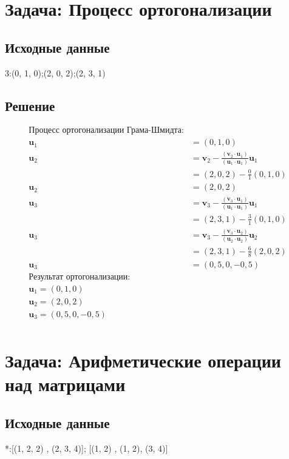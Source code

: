 \documentclass{article}
\begin{document}
\section{Задача: Процесс ортогонализации}
\subsection{Исходные данные}
3:(0, 1, 0);(2, 0, 2);(2, 3, 1)
\subsection{Решение}
\begin{align*}
\text{Процесс ортогонализации Грама-Шмидта:}\\
\mathbf{u}_1 &= (0, 1, 0) \\
\mathbf{u}_2 &= \mathbf{v}_2 - \frac{(\mathbf{v}_2 \cdot \mathbf{u}_1)}{(\mathbf{u}_1 \cdot \mathbf{u}_1)} \mathbf{u}_1 \\
&= (2, 0, 2) - \frac{0}{1}(0, 1, 0) \\
\mathbf{u}_2 &= (2, 0, 2) \\
\mathbf{u}_3 &= \mathbf{v}_3 - \frac{(\mathbf{v}_3 \cdot \mathbf{u}_1)}{(\mathbf{u}_1 \cdot \mathbf{u}_1)} \mathbf{u}_1 \\
&= (2, 3, 1) - \frac{3}{1}(0, 1, 0) \\
\mathbf{u}_3 &= \mathbf{v}_3 - \frac{(\mathbf{v}_3 \cdot \mathbf{u}_2)}{(\mathbf{u}_2 \cdot \mathbf{u}_2)} \mathbf{u}_2 \\
&= (2, 3, 1) - \frac{6}{8}(2, 0, 2) \\
\mathbf{u}_3 &= (0,5, 0, -0,5) \\
\text{Результат ортогонализации:}\\
\mathbf{u}_1 = (0, 1, 0) \\
\mathbf{u}_2 = (2, 0, 2) \\
\mathbf{u}_3 = (0,5, 0, -0,5) \\
\end{align*}
\section{Задача: Арифметические операции над матрицами}
\subsection{Исходные данные}
*:[(1, 2, 2) ,  (2, 3, 4)]; [(1, 2) ,  (1, 2),  (3, 4)]
\end{document}
